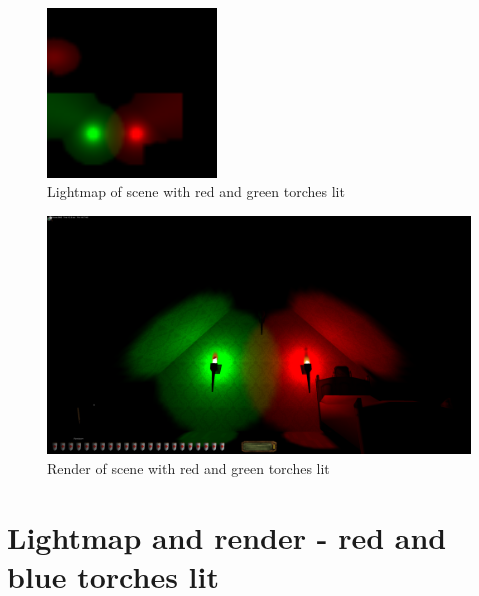 \begin{appendix}
\begin{figure}[htbp]
	\centering
		\includegraphics[width=0.40\textwidth]{img/PIX/rg.png}
	\caption[Lightmap of scene with red and green torches lit]{Lightmap of scene with red and green torches lit}
	\label{fig:LightmapRG}
\end{figure}
\begin{figure}[htbp]
	\centering
		\includegraphics[width=1.00\textwidth]{img/PIX/render_rg.png}
	\caption[Render of scene with red and green torches lit]{Render of scene with red and green torches lit}
	\label{fig:RenderRG}
\end{figure}

\clearpage
{}
\section{Lightmap and render - red and blue torches lit} 



\end{appendix}
